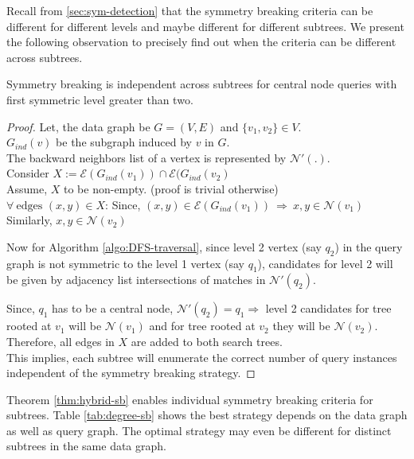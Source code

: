 Recall from \ref{sec:sym-detection} that the symmetry breaking criteria can be different for different levels and maybe different for different subtrees.
We present the following observation to precisely find out when the criteria can be different across subtrees.
\begin{theorem} \label{thm:hybrid-sb}
    Symmetry breaking is independent across subtrees for central node queries with first symmetric level greater than two.
\end{theorem}
\begin{proof}
    Let, the data graph be $G=(V, E)$ and $\{v_1, v_2\} \in V$.\\
    $G_{ind}(v)$ be the subgraph induced by $v$ in $G$.\\
    The backward neighbors list of a vertex is represented by $\mathcal{N}'(.)$.\\
    Consider $X:=\mathcal{E}(G_{ind}(v_1)) \cap \mathcal{E}(G_{ind}(v_2)$\\
    Assume, $X$ to be non-empty. (proof is trivial otherwise)\\
    $ \forall ~ \text{edges }(x,y) \in X$:
    Since, $(x,y) \in \mathcal{E}(G_{ind}(v_1)) ~ \Rightarrow ~ x,y \in \mathcal{N}(v_1)$\\
    Similarly,  $x,y \in \mathcal{N}(v_2)$

    Now for Algorithm \ref{algo:DFS-traversal}, since level 2 vertex (say $q_2$) in the query graph is not symmetric to the level 1 vertex (say $q_1$), candidates for level 2 will be given by adjacency list intersections of matches in $\mathcal{N'}(q_2)$. 

    Since, $q_1$ has to be a central node, $\mathcal{N'}(q_2)=q_1 \Rightarrow $ level 2 candidates for tree rooted at $v_1$ will be $\mathcal{N}(v_1)$ and for tree rooted at $v_2$ they will be $\mathcal{N}(v_2).$
    Therefore, all edges in $X$ are added to both search trees.\\
    This implies, each subtree will enumerate the correct number of query instances independent of the symmetry breaking strategy.
\end{proof}

Theorem \ref{thm:hybrid-sb} enables individual symmetry breaking criteria for subtrees.
Table \ref{tab:degree-sb} shows the best strategy depends on the data graph as well as query graph.
The optimal strategy may even be different for distinct subtrees in the same data graph.

